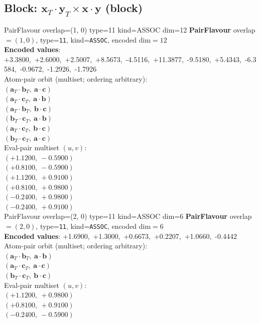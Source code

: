 \documentclass[a4paper,11pt]{article}
\newcommand{\pdcegfomjfhook}[2]{\mathbf{#1} \cdot \mathbf{#2}}
\newcommand{\fpbeomcfokjooi}[2]{\mathbf{#1}_T \cdot \mathbf{#2}_T}
\begin{document}
\subsection{Block: $\fpbeomcfokjooi{x}{y} \times \pdcegfomjfhook{x}{y}$  (block)}
    PairFlavour  overlap=(1, 0)  type=11  kind=ASSOC  dim=12
\textbf{PairFlavour} overlap$=(1, 0)$, type=\texttt{11}, kind=\texttt{ASSOC}, encoded dim$=12$\\
\textbf{      Encoded values}: +3.3800,\ +2.6000,\ +2.5007,\ +8.5673,\ -4.5116,\ +11.3877,\ -9.5180,\ +5.4343,\ -6.3584,\ -0.9672,\ -1.2926,\ -1.7926\\
\quad Atom-pair orbit (multiset; ordering arbitrary):\\
$(\fpbeomcfokjooi{a}{b},\ \pdcegfomjfhook{a}{c})$\\
$(\fpbeomcfokjooi{a}{c},\ \pdcegfomjfhook{a}{b})$\\
$(\fpbeomcfokjooi{a}{b},\ \pdcegfomjfhook{b}{c})$\\
$(\fpbeomcfokjooi{b}{c},\ \pdcegfomjfhook{a}{b})$\\
$(\fpbeomcfokjooi{a}{c},\ \pdcegfomjfhook{b}{c})$\\
$(\fpbeomcfokjooi{b}{c},\ \pdcegfomjfhook{a}{c})$\\
\quad Eval-pair multiset $(u, v)$:\\
$(+1.1200,\ -0.5900)$\\
$(+0.8100,\ -0.5900)$\\
$(+1.1200,\ +0.9100)$\\
$(+0.8100,\ +0.9800)$\\
$(-0.2400,\ +0.9800)$\\
$(-0.2400,\ +0.9100)$\\
    PairFlavour  overlap=(2, 0)  type=11  kind=ASSOC  dim=6
\textbf{PairFlavour} overlap$=(2, 0)$, type=\texttt{11}, kind=\texttt{ASSOC}, encoded dim$=6$\\
\textbf{      Encoded values}: +1.6900,\ +1.3000,\ +0.6673,\ +0.2207,\ +1.0660,\ -0.4442\\
\quad Atom-pair orbit (multiset; ordering arbitrary):\\
$(\fpbeomcfokjooi{a}{b},\ \pdcegfomjfhook{a}{b})$\\
$(\fpbeomcfokjooi{a}{c},\ \pdcegfomjfhook{a}{c})$\\
$(\fpbeomcfokjooi{b}{c},\ \pdcegfomjfhook{b}{c})$\\
\quad Eval-pair multiset $(u, v)$:\\
$(+1.1200,\ +0.9800)$\\
$(+0.8100,\ +0.9100)$\\
$(-0.2400,\ -0.5900)$\\
\end{document}
